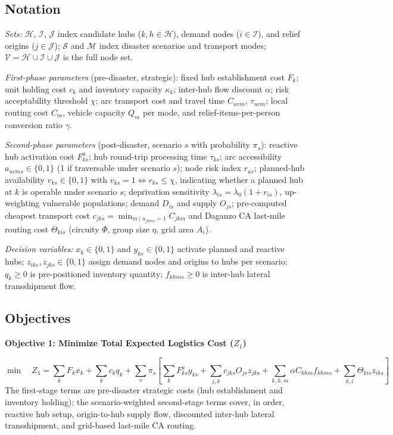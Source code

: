 \documentclass{llncs}
\begin{document}
\subsection{Notation}
\noindent
\textit{Sets:} $\mathcal{H}$, $\mathcal{I}$, $\mathcal{J}$ index candidate hubs ($k,h\in\mathcal{H}$), demand nodes ($i\in\mathcal{I}$), and relief origins ($j\in\mathcal{J}$); $\mathcal{S}$ and $\mathcal{M}$ index disaster scenarios and transport modes; $\mathcal{V}=\mathcal{H}\cup\mathcal{I}\cup\mathcal{J}$ is the full node set.

\smallskip\noindent
\textit{First-phase parameters} (pre-disaster, strategic): fixed hub establishment cost $F_k$; unit holding cost $c_k$ and inventory capacity $\kappa_k$; inter-hub flow discount $\alpha$; risk acceptability threshold $\chi$; arc transport cost and travel time $C_{uvm}$, $\tau_{uvm}$; local routing cost $C_m$, vehicle capacity $Q_m$ per mode, and relief-items-per-person conversion ratio $\gamma$.

\smallskip\noindent
\textit{Second-phase parameters} (post-disaster, scenario $s$ with probability $\pi_s$): reactive hub activation cost $F_{ks}^a$; hub round-trip processing time $\tau_{ks}$; arc accessibility $a_{uvms}\in\{0,1\}$ (1 if traversable under scenario $s$); node risk index $r_{us}$; planned-hub availability $v_{ks}\in\{0,1\}$ with $v_{ks}=1\!\iff\!r_{ks}\le\chi$, indicating whether a planned hub at $k$ is operable under scenario $s$; deprivation sensitivity $\lambda_{is}=\lambda_0(1+r_{is})$, up-weighting vulnerable populations; demand $D_{is}$ and supply $O_{js}$; pre-computed cheapest transport cost $c_{jks}=\min_{m\mid a_{jkms}=1}C_{jkm}$ and Daganzo CA last-mile routing cost $\Theta_{kis}$ (circuity $\Phi$, group size $\eta$, grid area $A_i$).

\smallskip\noindent
\textit{Decision variables:} $x_k\in\{0,1\}$ and $y_{ks}\in\{0,1\}$ activate planned and reactive hubs; $z_{iks},z_{jks}\in\{0,1\}$ assign demand nodes and origins to hubs per scenario; $q_k\ge0$ is pre-positioned inventory quantity; $f_{khms}\ge0$ is inter-hub lateral transshipment flow.

\subsection{Objectives}
\textbf{Objective 1: Minimize Total Expected Logistics Cost ($Z_1$)}

\begin{equation} \label{eq:obj1}
\min \quad Z_1 = \sum_{k} F_k x_k + \sum_{k} c_k q_k + \sum_{s} \pi_s \!\!\left[ \sum_{k} F_{ks}^a y_{ks} + \sum_{j,k} c_{jks} O_{js} z_{jks} + \sum_{k,h,m} \alpha C_{khm} f_{khms} + \sum_{k,i} \Theta_{kis} z_{iks} \right]
\end{equation}
The first-stage terms are pre-disaster strategic costs (hub establishment and inventory holding); the scenario-weighted second-stage terms cover, in order, reactive hub setup, origin-to-hub supply flow, discounted inter-hub lateral transshipment, and grid-based last-mile CA routing.
\end{document}
